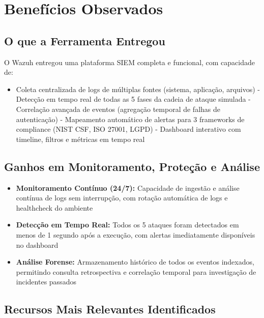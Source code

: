 \documentclass[12pt,a4paper]{article}
\begin{document}
    \newpage
    \section{Benefícios Observados}

    \subsection{O que a Ferramenta Entregou}

    O Wazuh entregou uma plataforma SIEM completa e funcional, com capacidade de:
    \begin{itemize}
        \item Coleta centralizada de logs de múltiplas fontes (sistema, aplicação, arquivos)
        - Detecção em tempo real de todas as 5 fases da cadeia de ataque simulada
        - Correlação avançada de eventos (agregação temporal de falhas de autenticação)
        - Mapeamento automático de alertas para 3 frameworks de compliance (NIST CSF, ISO 27001, LGPD)
        - Dashboard interativo com timeline, filtros e métricas em tempo real
    \end{itemize}

    \subsection{Ganhos em Monitoramento, Proteção e Análise}

    \begin{itemize}
        \item \textbf{Monitoramento Contínuo (24/7):} Capacidade de ingestão e análise contínua de logs sem interrupção, com rotação automática de logs e healthcheck do ambiente
        \item \textbf{Detecção em Tempo Real:} Todos os 5 ataques foram detectados em menos de 1 segundo após a execução, com alertas imediatamente disponíveis no dashboard
        \item \textbf{Análise Forense:} Armazenamento histórico de todos os eventos indexados, permitindo consulta retrospectiva e correlação temporal para investigação de incidentes passados
    \end{itemize}

    \subsection{Recursos Mais Relevantes Identificados}
\end{document}
